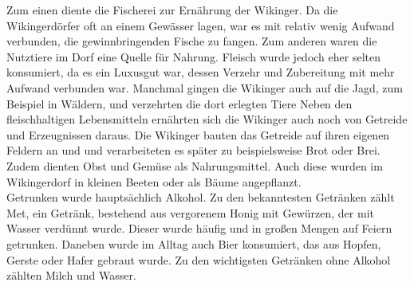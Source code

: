 \documentclass[12pt,a4paper,ngerman,openany]{book}
\begin{document}
Zum einen diente die Fischerei zur Ernährung der Wikinger. Da die Wikingerdörfer oft an einem Gewässer lagen, war es mit relativ wenig Aufwand verbunden, die gewinnbringenden Fische zu fangen. Zum anderen waren die Nutztiere im Dorf eine Quelle für Nahrung. Fleisch wurde jedoch eher selten konsumiert, da es ein Luxusgut war, dessen Verzehr und Zubereitung mit mehr Aufwand verbunden war. Manchmal gingen die Wikinger auch auf die Jagd, zum Beispiel in Wäldern, und verzehrten die dort erlegten Tiere
Neben den fleischhaltigen Lebensmitteln ernährten sich die Wikinger auch noch von Getreide und Erzeugnissen daraus. Die Wikinger bauten das Getreide auf ihren eigenen Feldern an und und verarbeiteten es später zu beispielsweise Brot oder Brei. Zudem dienten Obst und Gemüse als Nahrungsmittel. Auch diese wurden im Wikingerdorf in kleinen Beeten oder als Bäume angepflanzt.\\
Getrunken wurde hauptsächlich Alkohol. Zu den bekanntesten Getränken zählt Met, ein Getränk, bestehend aus vergorenem Honig mit Gewürzen, der mit Wasser verdünnt wurde. Dieser wurde häufig und in großen Mengen auf Feiern getrunken. Daneben wurde im Alltag auch Bier konsumiert, das aus Hopfen, Gerste oder Hafer gebraut wurde. Zu den wichtigsten Getränken ohne Alkohol zählten Milch und Wasser.
\end{document}
